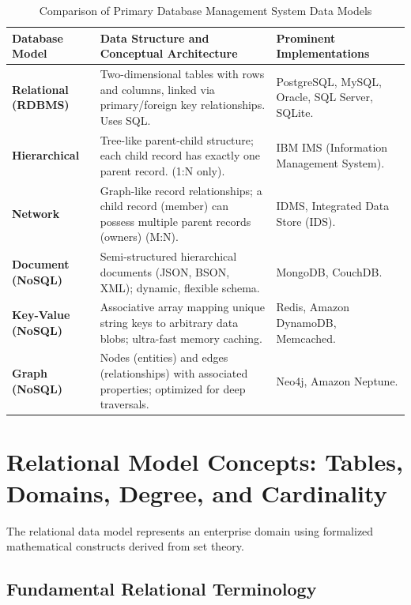 \begin{table}[htbp]
\centering
\caption{Comparison of Primary Database Management System Data Models}
\label{tab:dbms_models}
\begin{tabularx}{\textwidth}{p{3.2cm} X p{3.5cm}}
\toprule
\textbf{Database Model} & \textbf{Data Structure and Conceptual Architecture} & \textbf{Prominent Implementations} \\
\midrule
\textbf{Relational (RDBMS)} & Two-dimensional tables with rows and columns, linked via primary/foreign key relationships. Uses SQL. & PostgreSQL, MySQL, Oracle, SQL Server, SQLite. \\
\textbf{Hierarchical} & Tree-like parent-child structure; each child record has exactly one parent record. (1:N only). & IBM IMS (Information Management System). \\
\textbf{Network} & Graph-like record relationships; a child record (member) can possess multiple parent records (owners) (M:N). & IDMS, Integrated Data Store (IDS). \\
\textbf{Document (NoSQL)} & Semi-structured hierarchical documents (JSON, BSON, XML); dynamic, flexible schema. & MongoDB, CouchDB. \\
\textbf{Key-Value (NoSQL)} & Associative array mapping unique string keys to arbitrary data blobs; ultra-fast memory caching. & Redis, Amazon DynamoDB, Memcached. \\
\textbf{Graph (NoSQL)} & Nodes (entities) and edges (relationships) with associated properties; optimized for deep traversals. & Neo4j, Amazon Neptune. \\
\bottomrule
\end{tabularx}
\end{table}

\newpage
\section{Relational Model Concepts: Tables, Domains, Degree, and Cardinality}

The relational data model represents an enterprise domain using formalized mathematical constructs derived from set theory.

\subsection{Fundamental Relational Terminology}

